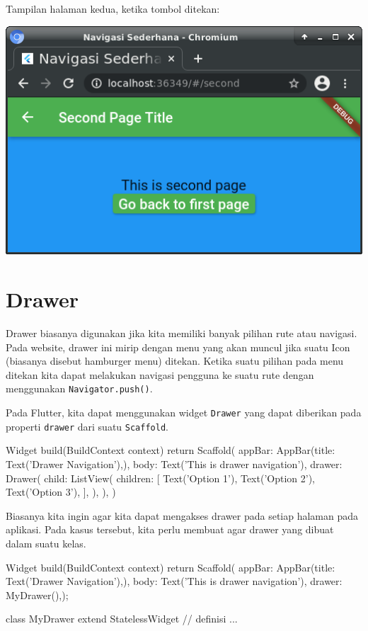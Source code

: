 \documentclass[a4paper,11pt]{article} %
\newcommand{\txtinline}[1]{\texttt{#1}}
\begin{document}
Tampilan halaman kedua, ketika tombol ditekan:

{\center
\includegraphics[scale=0.5]{images/navigation_named_02.png}
\par}


\section{Drawer}

Drawer biasanya digunakan jika kita memiliki banyak pilihan rute atau navigasi.
Pada website, drawer ini mirip dengan menu yang akan muncul jika suatu Icon (biasanya
disebut hamburger menu) ditekan. Ketika suatu pilihan pada menu ditekan kita dapat
melakukan navigasi pengguna ke suatu rute dengan menggunakan \txtinline{Navigator.push()}.

Pada Flutter, kita dapat menggunakan widget \txtinline{Drawer} yang dapat diberikan
pada properti \txtinline{drawer} dari suatu \txtinline{Scaffold}.
\begin{dartcode}
Widget build(BuildContext context) {
  return Scaffold(
    appBar: AppBar(title: Text('Drawer Navigation'),),
    body: Text('This is drawer navigation'),
    drawer: Drawer(
      child: ListView(
        children: [
          Text('Option 1'),
          Text('Option 2'),
          Text('Option 3'),
        ],
      ),
    ),
  )
}
\end{dartcode}

Biasanya kita ingin agar kita dapat mengakses drawer pada setiap halaman pada aplikasi.
Pada kasus tersebut, kita perlu membuat agar drawer yang dibuat dalam suatu kelas.
\begin{dartcode}
Widget build(BuildContext context) {
  return Scaffold(
    appBar: AppBar(title: Text('Drawer Navigation'),),
    body: Text('This is drawer navigation'),
    drawer: MyDrawer(),);
}

class MyDrawer extend StatelessWidget {
  // definisi ...
}
\end{dartcode}
\end{document}

